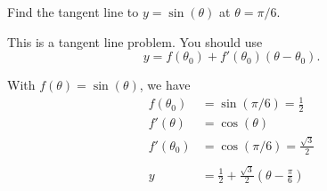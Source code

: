 \documentclass{ximera}
\author{Emma Smith Zbarsky}
\begin{document}
\begin{exercise}

Find the tangent line to $y = \sin(\theta)$ at $\theta = \pi/6$.


\begin{hint}
This is a tangent line problem. You should use
\[y = f(\theta_0)+f'(\theta_0)(\theta-\theta_0).\]
\end{hint}


\begin{hint}
With $f(\theta) = \sin(\theta)$, we have \begin{align*}
f(\theta_0) &= \sin(\pi/6) = \frac{1}{2} \\
f'(\theta) &= \cos(\theta) \\
f'(\theta_0) &= \cos(\pi/6) = \frac{\sqrt{3}}{2} \\
& \\
y &= \frac{1}{2}+\frac{\sqrt{3}}{2}\left(\theta-\frac{\pi}{6}\right)
\end{align*}
\end{hint}


\begin{multipleChoice}
\end{multipleChoice}

\end{exercise}
\end{document}
